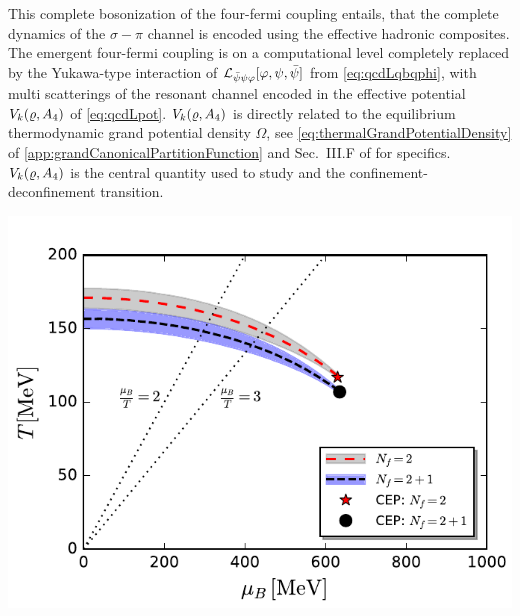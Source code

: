This complete bosonization of the four-fermi coupling entails, that the complete dynamics of the $\sigma-\pi$ channel is encoded using the effective hadronic composites.
The emergent four-fermi coupling is on a computational level completely replaced by the Yukawa-type interaction of $\mathcal{L}_{\bar{\psi}\psi\varphi}[\varphi,\psi,\bar{\psi}]$ from \cref{eq:qcdLqbqphi}, with multi scatterings of the resonant channel encoded in the effective potential $V_{k}(\varrho,A_4)$ of \cref{eq:qcdLpot}.
$V_{k}(\varrho,A_4)$ is directly related to the equilibrium thermodynamic grand potential density $\Omega$, see \cref{eq:thermalGrandPotentialDensity} of \cref{app:grandCanonicalPartitionFunction} and Sec.~III.F of  for specifics. 
$V_{k}(\varrho,A_4)$ is the central quantity used to study \csb{} and the confinement-deconfinement transition.\bigskip

	{\includegraphics[width=\subcaptionFigureWidth]{qcd/figures/PhysRevD.101.054032Fig20noType3.pdf}} %
